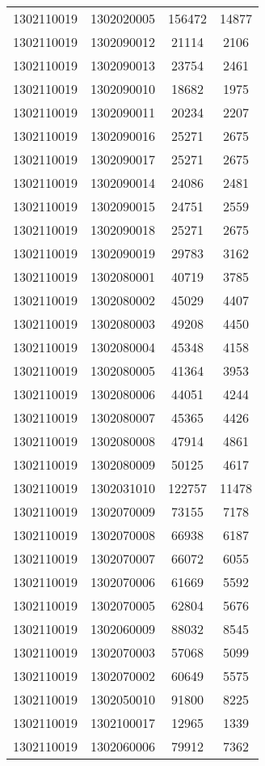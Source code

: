 \begin{longtable}[h]{llcc}
		1302110019 & 1302020005 & 156472 & 14877\\
		1302110019 & 1302090012 & 21114 & 2106\\
		1302110019 & 1302090013 & 23754 & 2461\\
		1302110019 & 1302090010 & 18682 & 1975\\
		1302110019 & 1302090011 & 20234 & 2207\\
		1302110019 & 1302090016 & 25271 & 2675\\
		1302110019 & 1302090017 & 25271 & 2675\\
		1302110019 & 1302090014 & 24086 & 2481\\
		1302110019 & 1302090015 & 24751 & 2559\\
		1302110019 & 1302090018 & 25271 & 2675\\
		1302110019 & 1302090019 & 29783 & 3162\\
		1302110019 & 1302080001 & 40719 & 3785\\
		1302110019 & 1302080002 & 45029 & 4407\\
		1302110019 & 1302080003 & 49208 & 4450\\
		1302110019 & 1302080004 & 45348 & 4158\\
		1302110019 & 1302080005 & 41364 & 3953\\
		1302110019 & 1302080006 & 44051 & 4244\\
		1302110019 & 1302080007 & 45365 & 4426\\
		1302110019 & 1302080008 & 47914 & 4861\\
		1302110019 & 1302080009 & 50125 & 4617\\
		1302110019 & 1302031010 & 122757 & 11478\\
		1302110019 & 1302070009 & 73155 & 7178\\
		1302110019 & 1302070008 & 66938 & 6187\\
		1302110019 & 1302070007 & 66072 & 6055\\
		1302110019 & 1302070006 & 61669 & 5592\\
		1302110019 & 1302070005 & 62804 & 5676\\
		1302110019 & 1302060009 & 88032 & 8545\\
		1302110019 & 1302070003 & 57068 & 5099\\
		1302110019 & 1302070002 & 60649 & 5575\\
		1302110019 & 1302050010 & 91800 & 8225\\
		1302110019 & 1302100017 & 12965 & 1339\\
		1302110019 & 1302060006 & 79912 & 7362\\

\end{longtable}
